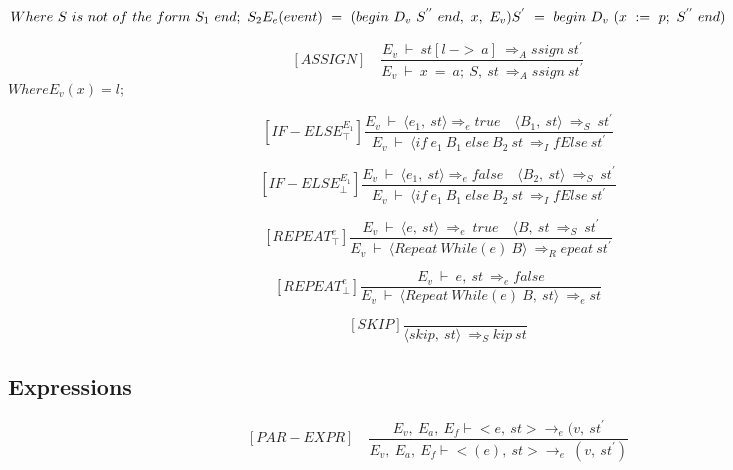    	\begin{math}
   		Where \ S \ is \ not \ of \ the \ form \ S_1 \ end; \ S_2 \newline
	   	E_e(event) \ = \ (begin \ D_v \ S^{''} \ end, \ x, \ E_v) \newline
	   	S^{'} \ = \ begin \ D_v \ (x \ := \ p; \ S^{''} \ end)
   	\end{math}
   	
   	\[
   	[ASSIGN] \quad
   	\dfrac{E_v \ \vdash \ st[l \ -> \ a] \ \Rightarrow_Assign \ st^{'}}{E_v \ \vdash \ x \ = \ a; \ S, \ st \ \Rightarrow_Assign \ st^{'}}
   	\]
   	\begin{math}
   		Where E_v(x) = l;
   	\end{math}
   	
   	\[
   	[IF-ELSE^{E_1}_\top]
   	\dfrac{E_v \ \vdash \ \langle e_1, \ st \rangle \Rightarrow_e true \quad \langle B_1, \ st \rangle \ \Rightarrow_S \ st^{'}}{E_v \ \vdash \ \langle if \ e_1 \ B_1 \ else \ B_2 \ st \ \Rightarrow_IfElse \ st^{'}}
   	\]
   	
   	\[
   	[IF-ELSE^{E_1}_\bot]
   	\dfrac{E_v \ \vdash \ \langle e_1, \ st \rangle \Rightarrow_e false \quad \langle B_2, \ st \rangle \ \Rightarrow_S \ st^{'}}{E_v \ \vdash \ \langle if \ e_1 \ B_1 \ else \ B_2 \ st \ \Rightarrow_IfElse \ st^{'}}
   	\]
   	
   	\[
   	[REPEAT^e_\top]
   	\dfrac{E_v \ \vdash \ \langle e, \ st \rangle \ \Rightarrow_e \ true \quad \langle B, \ st \ \Rightarrow_S \ st^{'}}{E_v \ \vdash \ \langle Repeat \ While(e) \ B \rangle \ \Rightarrow_Repeat \ st^{'}}
   	\]
   	
   	\[
   	[REPEAT^e_\bot]
   	\dfrac{E_v \ \vdash \ e, \ st \ \Rightarrow_e false}{E_v \ \vdash \ \langle Repeat \ While(e) \ B, \ st\rangle \ \Rightarrow_e st}
   	\]
   	
   	\[
   	[SKIP]
   	\dfrac{}{\langle skip, \ st \rangle \ \Rightarrow_Skip \ st}
   	\]
   	
   	\subsection{Expressions}
   	
   	\[
   	[PAR-EXPR] \quad
   	\dfrac{E_v, \ E_a, \ E_f \vdash <e, \ st> \rightarrow_e (v, \ st^{'}}{E_v, \ E_a, \ E_f \vdash <(e), \ st> \rightarrow_e \ (v, \ st^{'})}
   	\]
   	
